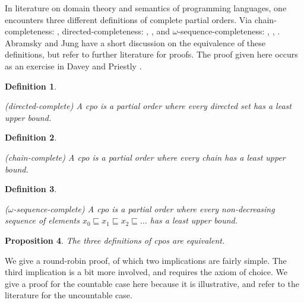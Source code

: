 \documentclass[a4paper]{article}
\newcommand{\below}{\sqsubseteq}
\newtheorem{definition}{Definition}[section]
\newtheorem{proposition}[definition]{Proposition}
\begin{document}
In literature on domain theory and semantics of programming languages, one
encounters three different definitions of complete partial orders.  Via
chain-completeness: \cite{Moschovakis1994}, directed-completeness:
\cite{DaveyPriestly1990}, \cite{Gunter1992}, and $\omega$-sequence-completeness:
\cite{Allison1986}, \cite{Winskel1993}, \cite{BarrWells1990}. Abramsky and Jung
\cite{Abramsky1994} have a short discussion on the equivalence of these
definitions, but refer to further literature for proofs. The proof given here
occurs as an exercise in Davey and Priestly \cite{DaveyPriestly1990}.

\begin{definition} \label{defCpoDirectedComplete}

(directed-complete) A \emph{cpo} is a partial order where every directed set has
a least upper bound.

\end{definition}


\begin{definition} \label{defCpoChainComplete}

(chain-complete) A \emph{cpo} is a partial order where every chain has a least
upper bound.

\end{definition}


\begin{definition} \label{defCpoOmegaSequenceComplete}

($\omega$-sequence-complete) A \emph{cpo} is a partial order where every
non-decreasing sequence of elements $x_0 \below x_1 \below x_2 \below \ldots $
has a least upper bound.

\end{definition}


\begin{proposition}

The three definitions of cpos are equivalent.

\end{proposition}


We give a round-robin proof, of which two implications are fairly simple. The
third implication is a bit more involved, and requires the axiom of choice. We
give a proof for the countable case here because it is illustrative, and refer
to the literature for the uncountable case.
\end{document}
